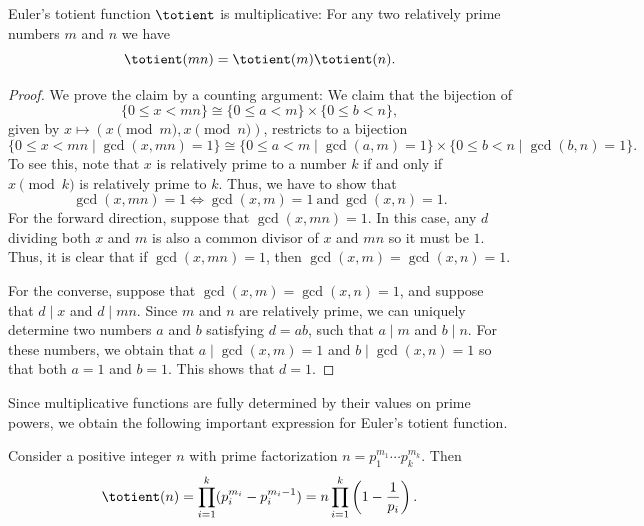 \begin{theorem}\label{theorem:multiplicative-totient}
  Euler's totient function $\totient$ is multiplicative: For any two relatively prime numbers $m$ and $n$ we have
  \begin{equation*}
    \totient(mn)=\totient(m)\totient(n).
  \end{equation*}
\end{theorem}

\begin{proof}
  We prove the claim by a counting argument: We claim that the bijection of 
  \begin{equation*}
    \{0\leq x<mn\}\cong
    \{0\leq a<m\}\times
    \{0\leq b<n\},
  \end{equation*}
  given by $x\mapsto(x\pmod{m},x\pmod{n})$, restricts to a bijection
  \begin{equation*}
    \{0\leq x<mn\mid\gcd(x,mn)=1\} \cong
    \{0\leq a<m\mid\gcd(a,m)=1\}\times
    \{0\leq b<n\mid\gcd(b,n)=1\}.
  \end{equation*}
  To see this, note that $x$ is relatively prime to a number $k$ if and only if $x\pmod{k}$ is relatively prime to $k$. Thus, we have to show that
  \begin{equation*}
    \gcd(x,mn)=1 \Leftrightarrow \gcd(x,m)=1~\text{and}~\gcd(x,n)=1.
  \end{equation*}
  For the forward direction, suppose that $\gcd(x,mn)=1$. In this case, any $d$ dividing both $x$ and $m$ is also a common divisor of $x$ and $mn$ so it must be $1$. Thus, it is clear that if $\gcd(x,mn)=1$, then $\gcd(x,m)=\gcd(x,n)=1$.

  For the converse, suppose that $\gcd(x,m)=\gcd(x,n)=1$, and suppose that $d\mid x$ and $d\mid mn$. Since $m$ and $n$ are relatively prime, we can uniquely determine two numbers $a$ and $b$ satisfying $d=ab$, such that $a\mid m$ and $b\mid n$. For these numbers, we obtain that $a\mid\gcd(x,m)=1$ and $b\mid\gcd(x,n)=1$ so that both $a=1$ and $b=1$. This shows that $d=1$. 
\end{proof}

Since multiplicative functions are fully determined by their values on prime powers, we obtain the following important expression for Euler's totient function.

\begin{theorem}\label{theorem:product-formula-totient}
  Consider a positive integer $n$ with prime factorization $n=p_1^{m_1}\cdots p_k^{m_k}$. Then
  \begin{equation*}
    \totient(n)=\prod_{i=1}^k(p_i^{m_i}-p_i^{m_i-1})=n\prod_{i=1}^k\left(1-\frac{1}{p_i}\right).
  \end{equation*}
\end{theorem}

